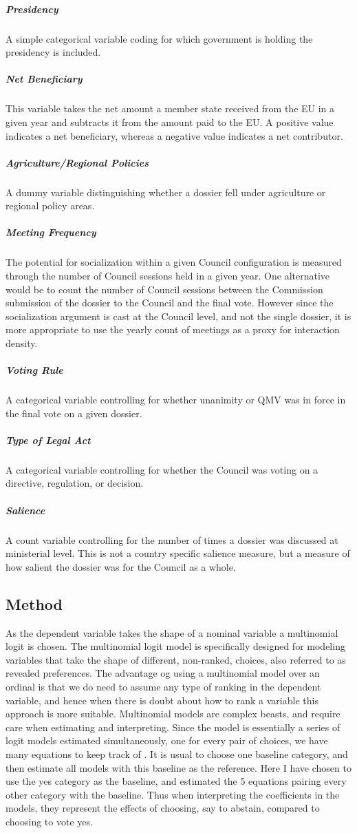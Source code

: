 \subparagraph{Presidency} A simple categorical variable coding for which government is holding the presidency is included.

\subparagraph{Net Beneficiary} This variable takes the net amount a member state received from the EU in a given year and subtracts it from the amount paid to the EU. A positive value indicates a net beneficiary, whereas a negative value indicates a net contributor. 

\subparagraph{Agriculture/Regional Policies} A dummy variable distinguishing whether a dossier fell under agriculture or regional policy areas.

\subparagraph{Meeting Frequency} The potential for socialization within a given Council configuration is measured through the number of Council sessions held in a given year. One alternative would be to count the number of Council sessions between the Commission submission of the dossier to the Council and the final vote. However since the socialization argument is cast at the Council level, and not the single dossier, it is more appropriate to use the yearly count of meetings as a proxy for interaction density. 

\subparagraph{Voting Rule} A categorical variable controlling for whether unanimity or QMV was in force in the final vote on a given dossier.

\subparagraph{Type of Legal Act} A categorical variable controlling for whether the Council was voting on a directive, regulation, or decision. 

\subparagraph{Salience} A count variable controlling for the number of times a dossier was discussed at ministerial level. This is not a country specific salience measure, but a measure of how salient the dossier was for the Council as a whole. 

\subsection{Method}

As the dependent variable takes the shape of a nominal variable a multinomial logit is chosen. The multinomial logit model is specifically designed for modeling variables that take the shape of different, non-ranked, choices, also referred to as revealed preferences. The advantage og using a multinomial model over an ordinal is that we do need to assume any type of ranking in the dependent variable, and hence when there is doubt about how to rank a variable this approach is more suitable. Multinomial models are complex beasts, and require care when estimating and interpreting. Since the  model is essentially a series of logit models estimated simultaneously, one for every pair of choices, we have many equations to keep track of \citep[CHapter 6]{Long1997}. It is usual to choose one baseline category, and then estimate all models with this baseline as the reference. Here I have chosen to use the yes category as the baseline, and estimated the 5 equations pairing every other category with the baseline. Thus when interpreting the coefficients in the models, they represent the effects of choosing, say to abstain, compared to choosing to vote yes. 



